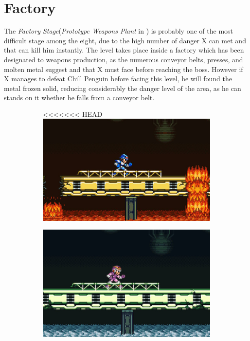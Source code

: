 \section{Factory} 
The \textit{Factory Stage}(\textit{Prototype Weapons Plant} in \mhx)  is probably one of the most difficult stage among the eight, due to the high number of danger X can met and that can kill him instantly. The level takes place inside a factory which has been designated to weapons production, as the numerous conveyor belts, presses, and molten metal suggest and that X must face before reaching the boss. However if X manages to defeat Chill Penguin before facing this level, he will found the metal frozen solid, reducing considerably the danger level of the area, as he can stands on it whether he falls from a conveyor belt.
\begin{figure}[h]
	\centering
	\begin{subfigure}{0.49\textwidth}
		\centering
<<<<<<< HEAD
		\includegraphics[width=\linewidth]{figures/X1/Flame_mammoth/Flame_fire.jpg}
		\caption{}
	\end{subfigure}
	\begin{subfigure}{0.465\textwidth}
		\centering
		\includegraphics[width=\linewidth]{figures/X1/Flame_mammoth/Flame_frozen.jpg}

\end{subfigure}
\end{figure}
